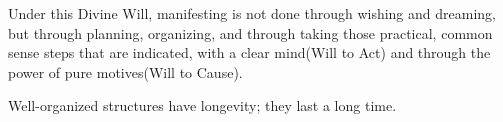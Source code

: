 \documentclass{pensee}
\begin{document}
Under this Divine Will, manifesting is not done through wishing and dreaming, but through planning, organizing, and through taking those practical, common sense steps that are indicated, with a clear mind(Will to Act) and through the power of pure motives(Will to Cause).


Well-organized structures have longevity; they last a long time.

\end{document}
